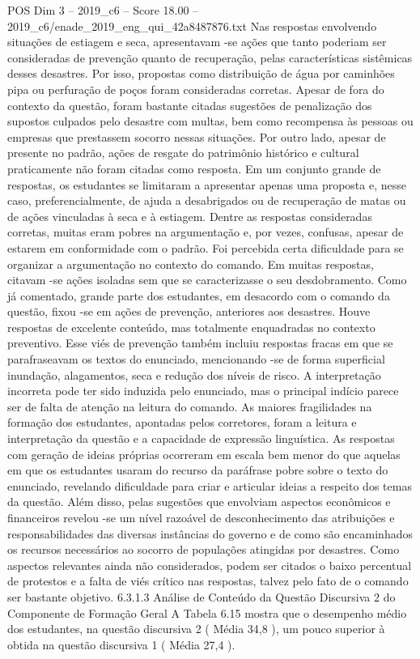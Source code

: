 \begin{textsample}{POS Dim 3 – 2019\_c6 – Score 18.00 – 2019\_c6/enade\_2019\_eng\_qui\_42a8487876.txt}
Nas respostas envolvendo situações de estiagem e seca, apresentavam -se ações que tanto poderiam ser consideradas de prevenção quanto de recuperação, pelas características sistêmicas desses desastres.
Por isso, propostas como distribuição de água por caminhões pipa ou perfuração de poços foram consideradas corretas.
Apesar de fora do contexto da questão, foram bastante citadas sugestões de penalização dos supostos culpados pelo desastre com multas, bem como recompensa às pessoas ou empresas que prestassem socorro nessas situações.
Por outro lado, apesar de presente no padrão, ações de resgate do patrimônio histórico e cultural praticamente não foram citadas como resposta.
Em um conjunto grande de respostas, os estudantes se limitaram a apresentar apenas uma proposta e, nesse caso, preferencialmente, de ajuda a desabrigados ou de recuperação de matas ou de ações vinculadas à seca e à estiagem.
Dentre as respostas consideradas corretas, muitas eram pobres na argumentação e, por vezes, confusas, apesar de estarem em conformidade com o padrão.
Foi percebida certa dificuldade para se organizar a argumentação no contexto do comando.
Em muitas respostas, citavam -se ações isoladas sem que se caracterizasse o seu desdobramento.
Como já comentado, grande parte dos estudantes, em desacordo com o comando da questão, fixou -se em ações de prevenção, anteriores aos desastres.
Houve respostas de excelente conteúdo, mas totalmente enquadradas no contexto preventivo.
Esse viés de prevenção também incluiu respostas fracas em que se parafraseavam os textos do enunciado, mencionando -se de forma superficial inundação, alagamentos, seca e redução dos níveis de risco.
A interpretação incorreta pode ter sido induzida pelo enunciado, mas o principal indício parece ser de falta de atenção na leitura do comando.
As maiores fragilidades na formação dos estudantes, apontadas pelos corretores, foram a leitura e interpretação da questão e a capacidade de expressão linguística.
As respostas com geração de ideias próprias ocorreram em escala bem menor do que aquelas em que os estudantes usaram do recurso da paráfrase pobre sobre o texto do enunciado, revelando dificuldade para criar e articular ideias a respeito dos temas da questão.
Além disso, pelas sugestões que envolviam aspectos econômicos e financeiros revelou -se um nível razoável de desconhecimento das atribuições e responsabilidades das diversas instâncias do governo e de como são encaminhados os recursos necessários ao socorro de populações atingidas por desastres.
Como aspectos relevantes ainda não considerados, podem ser citados o baixo percentual de protestos e a falta de viés crítico nas respostas, talvez pelo fato de o comando ser bastante objetivo. 6.3.1.3 Análise de Conteúdo da Questão Discursiva 2 do Componente de Formação Geral A Tabela 6.15 mostra que o desempenho médio dos estudantes, na questão discursiva 2 ( Média 34,8 ), um pouco superior à obtida na questão discursiva 1 ( Média 27,4 ).

\end{textsample}

